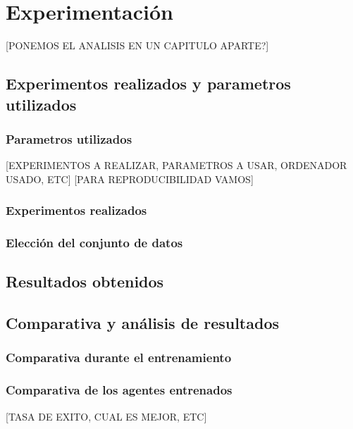 \chapter{Experimentación}

[PONEMOS EL ANALISIS EN UN CAPITULO APARTE?]

\section{Experimentos realizados y parametros utilizados}

\subsection{Parametros utilizados}
[EXPERIMENTOS A REALIZAR, PARAMETROS A USAR, ORDENADOR USADO, ETC]
[PARA REPRODUCIBILIDAD VAMOS]

\subsection{Experimentos realizados}

\subsection{Elección del conjunto de datos}

\section{Resultados obtenidos}

\section{Comparativa y análisis de resultados}

\subsection{Comparativa durante el entrenamiento}

\subsection{Comparativa de los agentes entrenados}
[TASA DE EXITO, CUAL ES MEJOR, ETC]